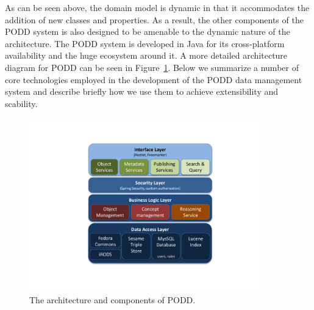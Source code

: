 \documentclass{elsarticle}
\begin{document}
As can be seen above, the domain model is dynamic in that
it accommodates the addition of new classes and properties.
As a result, the other components of the PODD system is also
designed to be amenable to the dynamic nature of the architecture.
%
The PODD system is developed in Java for its cross-platform
availability and the huge ecosystem around it. A more detailed
architecture diagram for PODD can be seen in
Figure~\ref{fig:podd_arch}. Below we summarize a number of core
technologies employed in the development of the PODD data management
system and describe briefly how we use them to achieve extensibility
and scability.

\begin{figure}[htb]
\centering
\includegraphics[trim = 60mm 30mm 50mm 28mm, clip,height=75mm]{podd_arch.pdf}
\vspace{-8pt} \caption{The architecture and components of
PODD.}\label{fig:podd_arch}
\end{figure}
\end{document}
